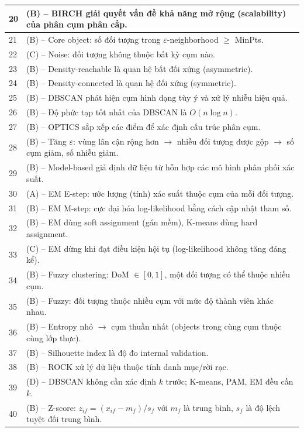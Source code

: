 \documentclass[10pt]{article}
\begin{document}
\begin{singlespace}
\begin{longtable}{|p{}|p{}|}
\hline
20 & (B) -- BIRCH giải quyết vấn đề khả năng mở rộng (scalability) của phân cụm phân cấp. \\
\hline
21 & (B) -- Core object: số đối tượng trong $\varepsilon$-neighborhood $\geq$ MinPts. \\
\hline
22 & (C) -- Noise: đối tượng không thuộc bất kỳ cụm nào. \\
\hline
23 & (B) -- Density-reachable là quan hệ bất đối xứng (asymmetric). \\
\hline
24 & (B) -- Density-connected là quan hệ đối xứng (symmetric). \\
\hline
25 & (B) -- DBSCAN phát hiện cụm hình dạng tùy ý và xử lý nhiễu hiệu quả. \\
\hline
26 & (B) -- Độ phức tạp tốt nhất của DBSCAN là $O(n\log n)$. \\
\hline
27 & (B) -- OPTICS sắp xếp các điểm để xác định cấu trúc phân cụm. \\
\hline
28 & (B) -- Tăng $\varepsilon$: vùng lân cận rộng hơn $\to$ nhiều đối tượng được gộp $\to$ số cụm giảm, số nhiễu giảm. \\
\hline
29 & (B) -- Model-based giả định dữ liệu từ hỗn hợp các mô hình phân phối xác suất. \\
\hline
30 & (A) -- EM E-step: ước lượng (tính) xác suất thuộc cụm của mỗi đối tượng. \\
\hline
31 & (B) -- EM M-step: cực đại hóa log-likelihood bằng cách cập nhật tham số. \\
\hline
32 & (B) -- EM dùng soft assignment (gán mềm), K-means dùng hard assignment. \\
\hline
33 & (C) -- EM dừng khi đạt điều kiện hội tụ (log-likelihood không tăng đáng kể). \\
\hline
34 & (B) -- Fuzzy clustering: DoM $\in [0,1]$, một đối tượng có thể thuộc nhiều cụm. \\
\hline
35 & (B) -- Fuzzy: đối tượng thuộc nhiều cụm với mức độ thành viên khác nhau. \\
\hline
36 & (B) -- Entropy nhỏ $\to$ cụm thuần nhất (objects trong cùng cụm thuộc cùng lớp thực). \\
\hline
37 & (B) -- Silhouette index là độ đo internal validation. \\
\hline
38 & (B) -- ROCK xử lý dữ liệu thuộc tính danh mục/rời rạc. \\
\hline
39 & (D) -- DBSCAN không cần xác định $k$ trước; K-means, PAM, EM đều cần $k$. \\
\hline
40 & (B) -- Z-score: $z_{if} = (x_{if} - m_f)/s_f$ với $m_f$ là trung bình, $s_f$ là độ lệch tuyệt đối trung bình. \\
\hline
\end{longtable}
\end{singlespace}
\end{document}
